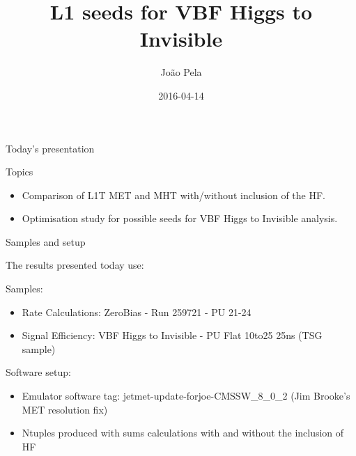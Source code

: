 \documentclass[8pt]{beamer}
\author[J. Pela]{João Pela}
\title{L1 seeds for VBF Higgs to Invisible}
\institute[ICL]{Imperial College London}
\date{2016-04-14}
\begin{document}
\setlength{\unitlength}{1mm}

\begin{frame}
  \titlepage
\end{frame}

\begin{frame}{Today's presentation}
 
\begin{block}{Topics}
 
\begin{itemize}
  \item Comparison of L1T MET and MHT with/without inclusion of the HF.
  \item Optimisation study for possible seeds for VBF Higgs to Invisible analysis.
\end{itemize}
 
\end{block}

\end{frame}

\begin{frame}{Samples and setup}

The results presented today use:
\begin{block}{Samples:}

\begin{itemize}
  \item Rate Calculations: ZeroBias - Run 259721 - PU 21-24
  \item Signal Efficiency: VBF Higgs to Invisible - PU Flat 10to25 25ns (TSG sample)
\end{itemize}

\end{block}

\begin{block}{Software setup:}
 
\begin{itemize}
  \item Emulator software tag: jetmet-update-forjoe-CMSSW\_8\_0\_2 (Jim Brooke's MET resolution fix)
  \item Ntuples produced with sums calculations with and without the inclusion of HF
\end{itemize}

\end{block}

\end{frame}
\end{document}

